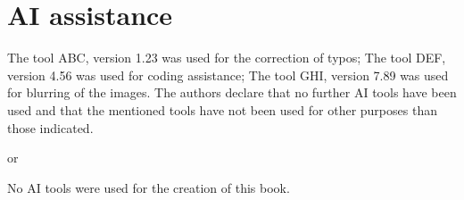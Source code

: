 \documentclass[output=paper,colorlinks,citecolor=brown]{langscibook}
\begin{document}
\section*{AI assistance}
The tool ABC, version 1.23 was used for the correction of typos;
The tool DEF, version 4.56 was used for coding assistance;
The tool GHI, version 7.89 was used for blurring of the images.
The authors declare that no further AI tools have been used and that the mentioned tools have not been used for other purposes than those indicated.


or

No AI tools were used for the creation of this book.


{\sloppy\printbibliography[heading=subbibliography,notkeyword=this]}
\end{document}
